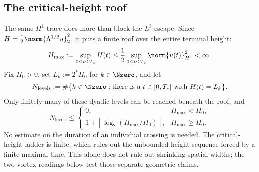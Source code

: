 \subsection{The critical-height roof}\label{sub:ClassicalContinuationCriteriaInsideFiniteRectangles}

The same \(H^1\) trace does more than block the \(L^3\) escape.  Since
\(H=\tfrac12\norm{\Lambda^{1/2}u}_2^2\), it puts a finite roof over the entire
terminal height:
\begin{equation}\label{eq:BodyCriticalHeightRoof}
  H_{\max}
  :=\sup_{0\leq t\leq T_*}H(t)
  \leq\frac12\sup_{0\leq t\leq T_*}\norm{u(t)}_{H^1}^2
  <\infty.
\end{equation}
Fix \(H_0>0\), set \(L_k:=2^kH_0\) for \(k\in\Nzero\), and let
\[
  N_{\mathrm{levels}}
  :=
  \#\bigl\{k\in\Nzero:\text{there is a }t\in[0,T_*]\text{ with }H(t)=L_k\bigr\}.
\]
Only finitely many of these dyadic levels can be reached beneath the roof, and
\begin{equation}\label{eq:BodyFiniteZenoOctaveCount}
  N_{\mathrm{levels}}
  \leq
  \begin{cases}
    0,&H_{\max}<H_0,\\[0.25em]
    1+\left\lfloor\log_2(H_{\max}/H_0)\right\rfloor,
      &H_{\max}\geq H_0.
  \end{cases}
\end{equation}
No estimate on the duration of an individual crossing is needed.
The critical-height ladder is finite, which rules out the unbounded height sequence forced by a finite maximal time.
This alone does not rule out shrinking spatial widths; the two vortex readings below test those separate geometric claims.

